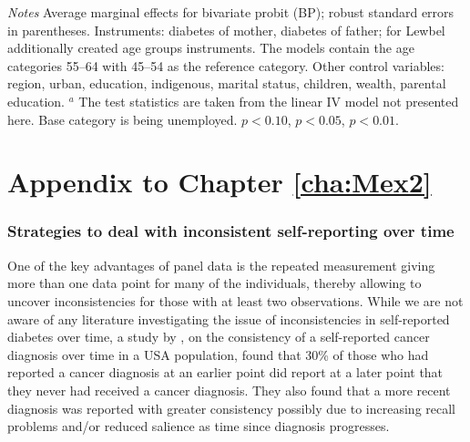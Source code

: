 \begin{table}[p]
\begin{center}
\begin{adjustbox}{max width=\textwidth, center}
\begin{threeparttable}
{\begin{tabular}{l*{4}{S S}}
\end{tabular} 
\begin{tablenotes}
\item \footnotesize \textit{Notes}  Average marginal effects for bivariate probit (BP); robust standard errors in parentheses. Instruments: diabetes of mother, diabetes of father; for Lewbel additionally created age groups instruments. The models contain the age categories 55--64 with 45--54 as the reference category. Other control variables: region, urban, education, indigenous, marital status, children, wealth, parental education. $^a$ The test statistics are taken from the linear IV model not presented here. Base category is being unemployed.
\sym{*} \(p<0.10\), \sym{**} \(p<0.05\), \sym{***} \(p<0.01\).
\end{tablenotes}
}
\end{threeparttable} 
\end{adjustbox}
\end{center}
\end{table}


\chapter{Appendix to Chapter \ref{cha:Mex2}}

\subsection*{\label{appendix_cha4_inconsist}Strategies to deal with inconsistent self-reporting over time}

One of the key advantages of panel data is the repeated measurement giving more than one data point for many of the individuals, thereby allowing to uncover inconsistencies for those with at least two observations. While we are not aware of any literature investigating the issue of inconsistencies in self-reported diabetes over time, a study by \textcite{Zajacova2010}, on the consistency of a self-reported cancer diagnosis over time in a USA population, found that 30\% of those who had reported a cancer diagnosis at an earlier point did report at a later point that they never had received a cancer diagnosis. They also found that a more recent diagnosis was reported with greater consistency possibly due to increasing recall problems and/or reduced salience as time since diagnosis progresses.

